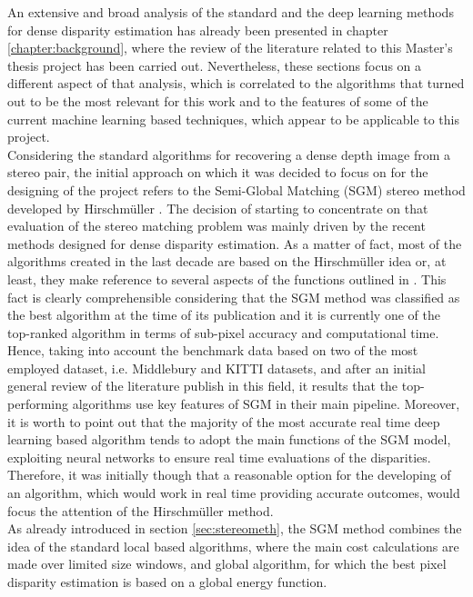 An extensive and broad analysis of the standard and the deep learning methods for dense disparity estimation has already been presented in chapter \ref{chapter:background}, where the review of the literature related to this Master's thesis project has been carried out.
Nevertheless, these sections focus on a different aspect of that analysis, which is correlated to the algorithms that turned out to be the most relevant for this work and to the features of some of the current machine learning based techniques, which appear to be applicable to this project.\\
Considering the standard algorithms for recovering a dense depth image from a stereo pair, the initial approach on which it was decided to focus on for the designing of the project refers to the Semi-Global Matching (SGM) stereo method developed by Hirschm\"{u}ller \cite{Hirschmuller2008}.
The decision of starting to concentrate on that evaluation of the stereo matching problem was mainly driven by the recent methods designed for dense disparity estimation.
As a matter of fact, most of the algorithms created in the last decade are based on the Hirschm\"{u}ller idea or, at least, they make reference to several aspects of the functions outlined in \cite{Hirschmuller2008}.
This fact is clearly comprehensible considering that the SGM method was classified as the best algorithm at the time of its publication and it is currently one of the top-ranked algorithm in terms of sub-pixel accuracy and computational time.
Hence, taking into account the benchmark data based on two of the most employed dataset, i.e. Middlebury \cite{Scharstein2014} and KITTI \cite{geiger2013vision} datasets, and after an initial general review of the literature publish in this field, it results that the top-performing algorithms use key features of SGM in their main pipeline. 
Moreover, it is worth to point out that the majority of the most accurate real time deep learning based algorithm tends to adopt the main functions of the SGM model, exploiting neural networks to ensure real time evaluations of the disparities.
Therefore, it was initially though that a reasonable option for the developing of an algorithm, which would work in real time providing accurate outcomes, would focus the attention of the Hirschm\"{u}ller method.\\
As already introduced in section \ref{sec:stereometh}, the SGM method combines the idea of the standard local based algorithms, where the main cost calculations are made over limited size windows, and global algorithm, for which the best pixel disparity estimation is based on a global energy function. 
